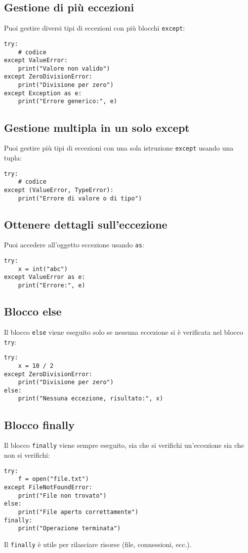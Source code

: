 \documentclass[a4paper,12pt]{article}
\begin{document}
\subsection*{Gestione di più eccezioni}
Puoi gestire diversi tipi di eccezioni con più blocchi \texttt{except}:
\begin{lstlisting}
try:
    # codice
except ValueError:
    print("Valore non valido")
except ZeroDivisionError:
    print("Divisione per zero")
except Exception as e:
    print("Errore generico:", e)
\end{lstlisting}

\subsection*{Gestione multipla in un solo except}
Puoi gestire più tipi di eccezioni con una sola istruzione \texttt{except} usando una tupla:
\begin{lstlisting}
try:
    # codice
except (ValueError, TypeError):
    print("Errore di valore o di tipo")
\end{lstlisting}

\subsection*{Ottenere dettagli sull'eccezione}
Puoi accedere all'oggetto eccezione usando \texttt{as}:
\begin{lstlisting}
try:
    x = int("abc")
except ValueError as e:
    print("Errore:", e)
\end{lstlisting}

\subsection*{Blocco else}
Il blocco \texttt{else} viene eseguito solo se nessuna eccezione si è verificata nel blocco \texttt{try}:
\begin{lstlisting}
try:
    x = 10 / 2
except ZeroDivisionError:
    print("Divisione per zero")
else:
    print("Nessuna eccezione, risultato:", x)
\end{lstlisting}

\subsection*{Blocco finally}
Il blocco \texttt{finally} viene sempre eseguito, sia che si verifichi un'eccezione sia che non si verifichi:
\begin{lstlisting}
try:
    f = open("file.txt")
except FileNotFoundError:
    print("File non trovato")
else:
    print("File aperto correttamente")
finally:
    print("Operazione terminata")
\end{lstlisting}
Il \texttt{finally} è utile per rilasciare risorse (file, connessioni, ecc.).
\end{document}
